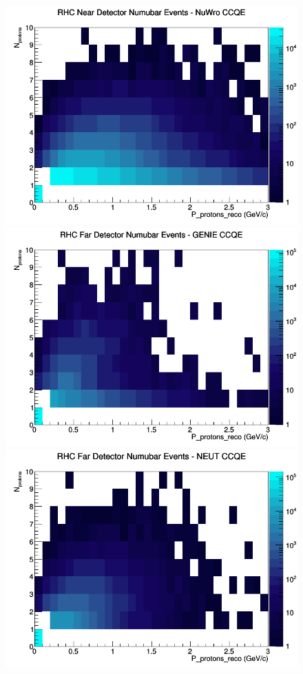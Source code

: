 \documentclass[12pt]{article}
\begin{document}
\begin{figure}[h]
\includegraphics[width=\linewidth]{eff_N_P/LAr/protons/CCQE_RHC_ND_numubar_N_P_NuWro.png}
\endminipage
\newline
{}
\includegraphics[width=\linewidth]{eff_N_P/LAr/protons/CCQE_RHC_FD_numubar_N_P_GENIE.png}
\endminipage
{}
\includegraphics[width=\linewidth]{eff_N_P/LAr/protons/CCQE_RHC_FD_numubar_N_P_NEUT.png}

\end{figure}
\end{document}
